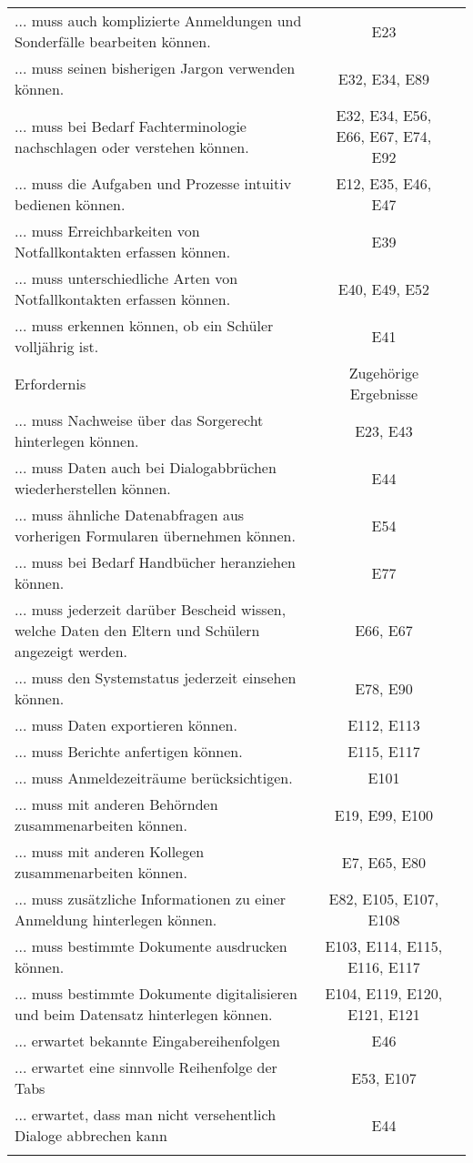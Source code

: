 \begin{landscape}
\begin{longtable}{p{15cm}cc}
... muss auch komplizierte Anmeldungen und Sonderfälle bearbeiten können. & E23 \\
... muss seinen bisherigen Jargon verwenden können. & E32, E34, E89 \\
... muss bei Bedarf Fachterminologie nachschlagen oder verstehen können. & E32, E34, E56, E66, E67, E74, E92 \\
... muss die Aufgaben und Prozesse intuitiv bedienen können. & E12, E35, E46, E47 \\
... muss Erreichbarkeiten von Notfallkontakten erfassen können. & E39 \\
... muss unterschiedliche Arten von Notfallkontakten erfassen können. & E40, E49, E52 \\
... muss erkennen können, ob ein Schüler volljährig ist. & E41 \\
        \endfirsthead
        \toprule
        Erfordernis & Zugehörige Ergebnisse \\
        \midrule
        \endhead
        \bottomrule
        \endfoot
... muss Nachweise über das Sorgerecht hinterlegen können. & E23, E43 \\
... muss Daten auch bei Dialogabbrüchen wiederherstellen können. & E44 \\
... muss ähnliche Datenabfragen aus vorherigen Formularen übernehmen können. & E54 \\
... muss bei Bedarf Handbücher heranziehen können. & E77 \\
... muss jederzeit darüber Bescheid wissen, welche Daten den Eltern und Schülern angezeigt werden. & E66, E67 \\
... muss den Systemstatus jederzeit einsehen können. & E78, E90 \\
... muss Daten exportieren können. & E112, E113 \\
... muss Berichte anfertigen können. & E115, E117 \\
... muss Anmeldezeiträume berücksichtigen. & E101 \\
... muss mit anderen Behörnden zusammenarbeiten können. & E19, E99, E100 \\
... muss mit anderen Kollegen zusammenarbeiten können. & E7, E65, E80 \\
... muss zusätzliche Informationen zu einer Anmeldung hinterlegen können. & E82, E105, E107, E108 \\
... muss bestimmte Dokumente ausdrucken können. & E103, E114, E115, E116, E117 \\
... muss bestimmte Dokumente digitalisieren und beim Datensatz hinterlegen können. & E104, E119, E120, E121, E121 \\
... erwartet bekannte Eingabereihenfolgen & E46 \\
... erwartet eine sinnvolle Reihenfolge der Tabs & E53, E107 \\
... erwartet, dass man nicht versehentlich Dialoge abbrechen kann & E44 \\
    \label{tab:erfordernisse}
\end{longtable}



\end{landscape}
